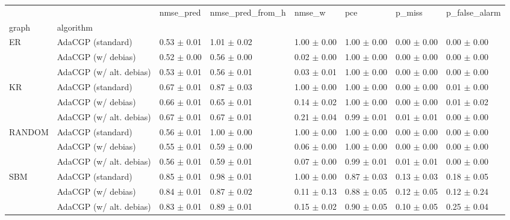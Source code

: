 \begin{tabular}{llllllll}
\toprule
 &  & nmse_pred & nmse_pred_from_h & nmse_w & pce & p_miss & p_false_alarm \\
graph & algorithm &  &  &  &  &  &  \\
\midrule
\multirow[t]{3}{*}{ER} & AdaCGP (standard) & 0.53 $\pm$ 0.01 & 1.01 $\pm$ 0.02 & 1.00 $\pm$ 0.00 & 1.00 $\pm$ 0.00 & 0.00 $\pm$ 0.00 & 0.00 $\pm$ 0.00 \\
 & AdaCGP (w/ debias) & 0.52 $\pm$ 0.00 & 0.56 $\pm$ 0.00 & 0.02 $\pm$ 0.00 & 1.00 $\pm$ 0.00 & 0.00 $\pm$ 0.00 & 0.00 $\pm$ 0.00 \\
 & AdaCGP (w/ alt. debias) & 0.53 $\pm$ 0.01 & 0.56 $\pm$ 0.01 & 0.03 $\pm$ 0.01 & 1.00 $\pm$ 0.00 & 0.00 $\pm$ 0.00 & 0.00 $\pm$ 0.00 \\
\cline{1-8}
\multirow[t]{3}{*}{KR} & AdaCGP (standard) & 0.67 $\pm$ 0.01 & 0.87 $\pm$ 0.03 & 1.00 $\pm$ 0.00 & 1.00 $\pm$ 0.00 & 0.00 $\pm$ 0.00 & 0.01 $\pm$ 0.00 \\
 & AdaCGP (w/ debias) & 0.66 $\pm$ 0.01 & 0.65 $\pm$ 0.01 & 0.14 $\pm$ 0.02 & 1.00 $\pm$ 0.00 & 0.00 $\pm$ 0.00 & 0.01 $\pm$ 0.02 \\
 & AdaCGP (w/ alt. debias) & 0.67 $\pm$ 0.01 & 0.67 $\pm$ 0.01 & 0.21 $\pm$ 0.04 & 0.99 $\pm$ 0.01 & 0.01 $\pm$ 0.01 & 0.00 $\pm$ 0.00 \\
\cline{1-8}
\multirow[t]{3}{*}{RANDOM} & AdaCGP (standard) & 0.56 $\pm$ 0.01 & 1.00 $\pm$ 0.00 & 1.00 $\pm$ 0.00 & 1.00 $\pm$ 0.00 & 0.00 $\pm$ 0.00 & 0.00 $\pm$ 0.00 \\
 & AdaCGP (w/ debias) & 0.55 $\pm$ 0.01 & 0.59 $\pm$ 0.00 & 0.06 $\pm$ 0.00 & 1.00 $\pm$ 0.00 & 0.00 $\pm$ 0.00 & 0.00 $\pm$ 0.00 \\
 & AdaCGP (w/ alt. debias) & 0.56 $\pm$ 0.01 & 0.59 $\pm$ 0.01 & 0.07 $\pm$ 0.00 & 0.99 $\pm$ 0.01 & 0.01 $\pm$ 0.01 & 0.00 $\pm$ 0.00 \\
\cline{1-8}
\multirow[t]{3}{*}{SBM} & AdaCGP (standard) & 0.85 $\pm$ 0.01 & 0.98 $\pm$ 0.01 & 1.00 $\pm$ 0.00 & 0.87 $\pm$ 0.03 & 0.13 $\pm$ 0.03 & 0.18 $\pm$ 0.05 \\
 & AdaCGP (w/ debias) & 0.84 $\pm$ 0.01 & 0.87 $\pm$ 0.02 & 0.11 $\pm$ 0.13 & 0.88 $\pm$ 0.05 & 0.12 $\pm$ 0.05 & 0.12 $\pm$ 0.24 \\
 & AdaCGP (w/ alt. debias) & 0.83 $\pm$ 0.01 & 0.89 $\pm$ 0.01 & 0.15 $\pm$ 0.02 & 0.90 $\pm$ 0.05 & 0.10 $\pm$ 0.05 & 0.25 $\pm$ 0.04 \\
\cline{1-8}
\bottomrule
\end{tabular}
